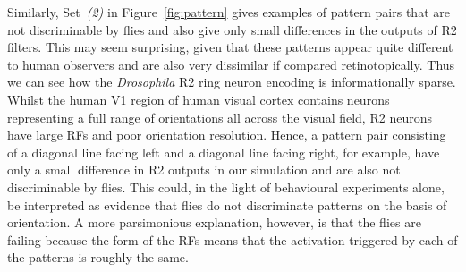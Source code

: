 \documentclass[10pt]{article}
\begin{document}
Similarly, Set~\emph{(2)} in Figure~\ref{fig:pattern} gives examples of pattern pairs that are not discriminable by flies and also give only small differences in the outputs of R2 filters. This may seem surprising, given that these patterns appear quite different to human observers and are also very dissimilar if compared retinotopically. Thus we can see how the \emph{Drosophila} R2 ring neuron encoding is informationally sparse. Whilst the human V1 region of human visual cortex contains neurons representing a full range of orientations all across the visual field, R2 neurons have large RFs and poor orientation resolution. Hence, a pattern pair consisting of a diagonal line facing left and a diagonal line facing right, for example, have only a small difference in R2 outputs in our simulation and are also not discriminable by flies. This could, in the light of behavioural experiments alone, be interpreted as evidence that flies do not discriminate patterns on the basis of orientation. A more parsimonious explanation, however, is that the flies are failing because the form of the RFs means that the activation triggered by each of the patterns is roughly the same.
\end{document}

